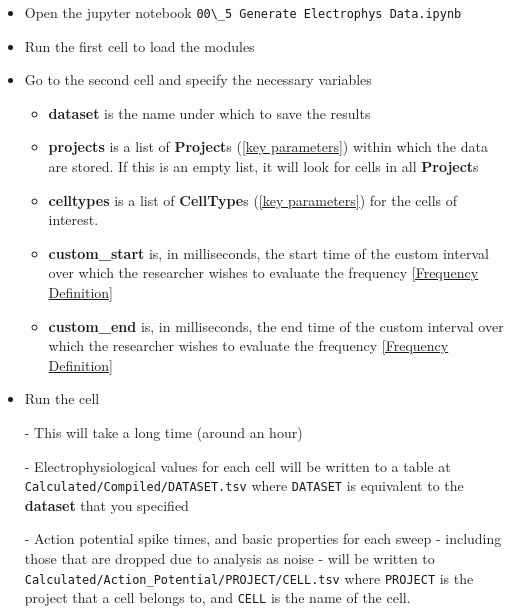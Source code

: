 \documentclass{article}
\begin{document}
\begin{itemize}
    \item Open the jupyter notebook \verb|00\_5 Generate Electrophys Data.ipynb|
    
    \item Run the first cell to load the modules
    
    \item Go to the second cell and specify the necessary variables
    \begin{itemize}
        \item \textbf{dataset} is the name under which to save the results
        
        \item \textbf{projects} is a list of \textbf{Project}s (\ref{key parameters}) within which the data are stored. If this is an empty list, it will look for cells in all \textbf{Project}s
        
        \item \textbf{celltypes} is a list of \textbf{CellType}s (\ref{key parameters}) for the cells of interest.
        
        \item \textbf{custom\_start} is, in milliseconds, the start time of the custom interval over which the researcher wishes to evaluate the frequency \ref{Frequency Definition}
        
        \item \textbf{custom\_end} is, in milliseconds, the end time of the custom interval over which the researcher wishes to evaluate the frequency \ref{Frequency Definition}
    \end{itemize}
    
    \item Run the cell
    
    - This will take a long time (around an hour)
    
    - Electrophysiological values for each cell will be written to a table at \verb|Calculated/Compiled/DATASET.tsv| where \verb|DATASET| is equivalent to the \textbf{dataset} that you specified
    
    - Action potential spike times, and basic properties for each sweep - including those that are dropped due to analysis as noise - will be written to \verb|Calculated/Action_Potential/PROJECT/CELL.tsv| where \verb|PROJECT| is the project that a cell belongs to, and \verb|CELL| is the name of the cell.
\end{itemize}
\end{document}
